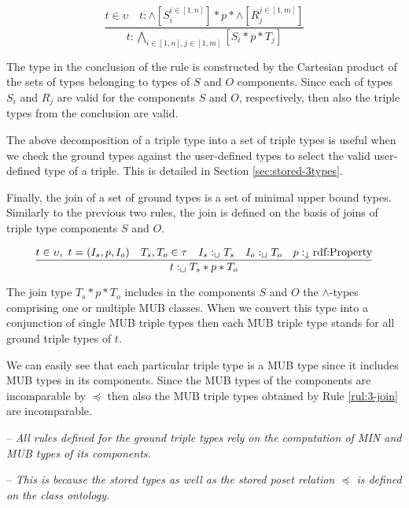 \documentclass[runningheads]{llncs}
\newcommand{\darr}{\downarrow}
\newcommand{\memo}[1]{}
\newcommand{\notes}[1]{\noindent\begin{small}-- \emph{#1}\hfill\break\end{small}}
\begin{document}
\begin{equation}
\label{rul:3-land-transform}
\dfrac{t\in\upsilon\quad t:\land[S_i^{i\in[1,n]}]*p*\land[R_j^{j\in[1,m]}]}
      {t:\bigwedge_{i\in[1,n], j\in[1,m]}[S_i*p*T_j]}
\end{equation}

The type in the conclusion of the rule is constructed by the Cartesian
product of the sets of types belonging to types of $S$ and $O$
components. Since each of types $S_i$ and $R_j$ are valid for the
components $S$ and $O$, respectively, then also the triple types from
the conclusion are valid.

The above decomposition of a triple type into a set of triple types is
useful when we check the ground types against the user-defined types
to select the valid user-defined type of a triple. This is detailed in
Section \ref{sec:stored-3types}.

Finally, the join of a set of ground types is a set of minimal upper
bound types. Similarly to the previous two rules, the join is defined
on the basis of joins of triple type components $S$ and $O$.

\begin{equation}
\label{rul:3-join}
\dfrac{t\in\upsilon,\ t=(I_s,p,I_o)\quad T_s,T_o\in\tau\quad I_s:_\sqcup\/T_s\quad I_o:_\sqcup\/T_o\quad p:_\darr\text{rdf:Property}}
      {t:_\sqcup\/T_s*p*T_o}
\end{equation}

The join type $T_s*p*T_o$ includes in the components $S$ and $O$ the
$\land$-types comprising one or multiple MUB classes. When we convert
this type into a conjunction of single MUB triple types then each MUB
triple type stands for all ground triple types of $t$.

We can easily see that each particular triple type is a MUB type since
it includes MUB types in its components. Since the MUB types of the
components are incomparable by $\preceq$ then also the MUB triple
types obtained by Rule \ref{rul:3-join} are incomparable.

\notes{All rules defined for the ground triple types rely on the computation of MIN and MUB types of its components.}
\notes{This is because the stored types as well as the stored poset relation $\preceq$ is defined on the class ontology.}

\memo{The types of $s$ and $o$ can be any classes $T_s$ and $T_o$ from
  ${\cal I}_c$, while the type of $p$ has to be a class $T_p$ that is
  a subclass of rdf:Property. The typing of a triple $t$ is correct
  since the interpretation of $T$ includes $t$.}
\end{document}
